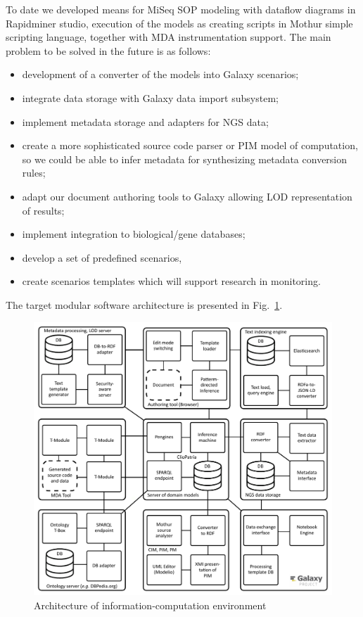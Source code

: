 \documentclass[a4paper]{jpconf}
\begin{document}
To date we developed means for MiSeq SOP modeling with dataflow diagrams in Rapidminer studio, execution of the models as creating scripts in Mothur simple scripting language, together with MDA instrumentation support. The main problem to be solved in the future is as follows:
\begin{itemize}
\item development of a converter of the models into Galaxy scenarios;
\item integrate data storage with Galaxy data import subsystem;
\item implement metadata storage and adapters for NGS data;
\item create a more sophisticated source code parser or PIM model of computation, so we could be able to infer metadata for synthesizing metadata conversion rules;
\item adapt our document authoring tools to Galaxy allowing LOD representation of results;
\item implement integration to biological/gene databases;
\item develop a set of predefined scenarios,
\item create scenarios templates which will support research in monitoring.
\end{itemize}
The target modular software architecture is presented in Fig.~\ref{fig:metadata}.
\begin{figure}[bt]
  \centering
   \includegraphics[width=0.8\linewidth]{architecture-mda-lod-ext-galaxy.pdf}
  \caption{Architecture of information-computation environment}
  \label{fig:metadata}
\end{figure}
\end{document}
